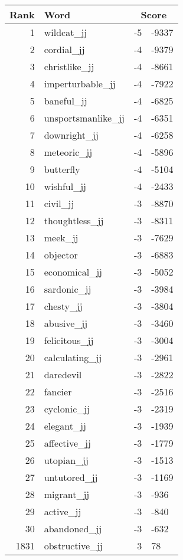\begin{longtable}[!htbp]{| rlr@{.}l |}
    \hline
    \textbf{Rank} & \textbf{Word} & \multicolumn{2}{c|}{\textbf{Score}} \\
    \hline
    \endhead
    1 & wildcat\_jj & -5 & -9337 \\
    2 & cordial\_jj & -4 & -9379 \\
    3 & christlike\_jj & -4 & -8661 \\
    4 & imperturbable\_jj & -4 & -7922 \\
    5 & baneful\_jj & -4 & -6825 \\
    6 & unsportsmanlike\_jj & -4 & -6351 \\
    7 & downright\_jj & -4 & -6258 \\
    8 & meteoric\_jj & -4 & -5896 \\
    9 & butterfly & -4 & -5104 \\
    10 & wishful\_jj & -4 & -2433 \\
    11 & civil\_jj & -3 & -8870 \\
    12 & thoughtless\_jj & -3 & -8311 \\
    13 & meek\_jj & -3 & -7629 \\
    14 & objector & -3 & -6883 \\
    15 & economical\_jj & -3 & -5052 \\
    16 & sardonic\_jj & -3 & -3984 \\
    17 & chesty\_jj & -3 & -3804 \\
    18 & abusive\_jj & -3 & -3460 \\
    19 & felicitous\_jj & -3 & -3004 \\
    20 & calculating\_jj & -3 & -2961 \\
    21 & daredevil & -3 & -2822 \\
    22 & fancier & -3 & -2516 \\
    23 & cyclonic\_jj & -3 & -2319 \\
    24 & elegant\_jj & -3 & -1939 \\
    25 & affective\_jj & -3 & -1779 \\
    26 & utopian\_jj & -3 & -1513 \\
    27 & untutored\_jj & -3 & -1169 \\
    28 & migrant\_jj & -3 & -936 \\
    29 & active\_jj & -3 & -840 \\
    30 & abandoned\_jj & -3 & -632 \\
    1831 & obstructive\_jj & 3 & 78 \\

\end{longtable}

